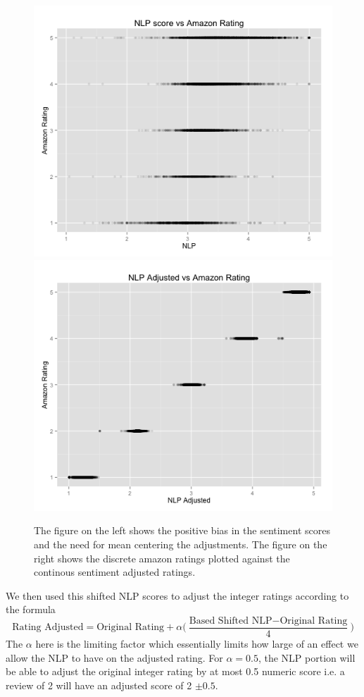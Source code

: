 \documentclass{article} %
\begin{document}
\begin{figure}[H]
  \centering
\includegraphics[scale=0.4]{amazon}
\includegraphics[scale=0.4]{adjusted}
\caption{The figure on the left shows the positive bias in the sentiment scores and the need for mean centering the adjustments. The figure on the right shows the discrete amazon ratings plotted against the continous sentiment adjusted ratings.}
\end{figure}

We then used this shifted NLP scores to adjust the integer ratings according to the formula
\[
\text{Rating Adjusted} = \text{Original Rating} + \alpha \bigg( \frac{\text{Based Shifted NLP} - \text{Original Rating}}{4} \bigg)
\]
The $\alpha$ here is the limiting factor which essentially limits how large of an effect we allow the NLP to have on the adjusted rating. For $\alpha = 0.5$, the NLP portion will be able to adjust the original integer rating by at most 0.5 numeric score i.e. a review of 2 will have an adjusted score of 2 $\pm 0.5$. 
\end{document}
